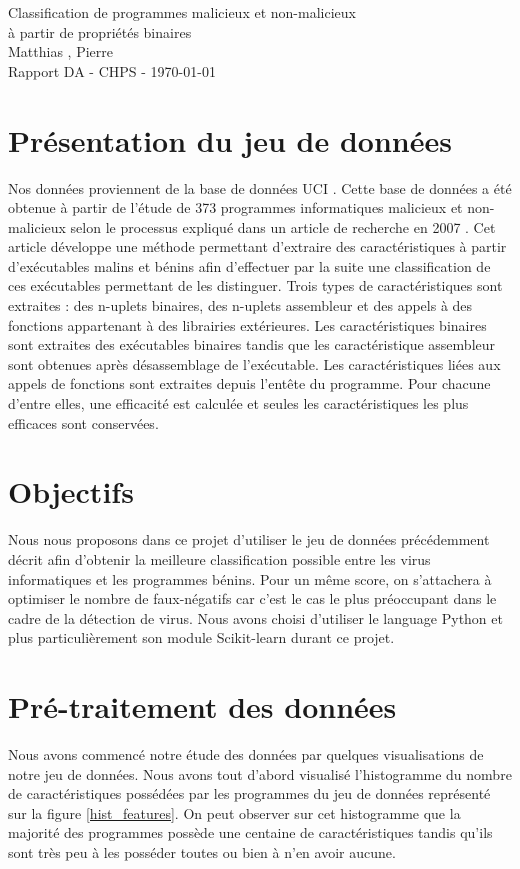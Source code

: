 \documentclass[11pt,a4paper]{article}
\begin{document}
\begin{center}

	{\LARGE\centering Classification de programmes malicieux et non-malicieux\\ à partir de propriétés binaires}\\[1cm]

	{ Matthias , Pierre }\\[0.5cm]
	{Rapport DA - CHPS - \today}
\end{center}

\tableofcontents

\section{Présentation du jeu de données}
	Nos données proviennent de la base de données UCI \cite{UCI}.
	Cette base de données a été obtenue à partir de l'étude de 373 programmes informatiques malicieux et non-malicieux selon le processus expliqué dans un article de recherche en 2007 \cite{article}. Cet article développe une méthode permettant d'extraire des caractéristiques à partir d'exécutables malins et bénins afin d'effectuer par la suite une classification de ces exécutables permettant de les distinguer. Trois types de caractéristiques sont extraites : des n-uplets binaires, des n-uplets assembleur et des appels à des fonctions appartenant à des librairies extérieures. Les caractéristiques binaires sont extraites des exécutables binaires tandis que les caractéristique assembleur sont obtenues après désassemblage de l'exécutable. Les caractéristiques liées aux appels de fonctions sont extraites depuis l'entête du programme. Pour chacune d'entre elles, une efficacité est calculée et seules les caractéristiques les plus efficaces sont conservées.

\section{Objectifs}
	Nous nous proposons dans ce projet d'utiliser le jeu de données précédemment décrit afin d'obtenir la meilleure classification possible entre les virus informatiques et les programmes bénins. Pour un même score, on s'attachera à optimiser le nombre de faux-négatifs car c'est le cas le plus préoccupant dans le cadre de la détection de virus. Nous avons choisi d'utiliser le language Python et plus particulièrement son module Scikit-learn \cite{sklearn} durant ce projet.

\section{Pré-traitement des données}
	Nous avons commencé notre étude des données par quelques visualisations de notre jeu de données. Nous avons tout d'abord visualisé l'histogramme du nombre de caractéristiques possédées par les programmes du jeu de données représenté sur la figure \ref{hist_features}. On peut observer sur cet histogramme que la majorité des programmes possède une centaine de caractéristiques tandis qu'ils sont très peu à les posséder toutes ou bien à n'en avoir aucune.
\end{document}

